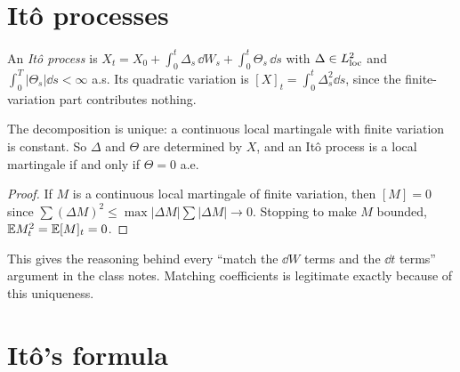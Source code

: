 \section{It\^o processes}

\begin{definition}
An \emph{It\^o process} is $X_t=X_0+\int_0^t\Delta_s\,\dd W_s+\int_0^t\Theta_s\,\dd s$ with $\Delta\in L^2_{\rm loc}$ and $\int_0^T|\Theta_s|\dd s<\infty$ a.s. Its quadratic variation is $[X]_t=\int_0^t\Delta_s^2\dd s$, since the finite-variation part contributes nothing.
\end{definition}

\begin{theorem}\label{thm:decomp}
The decomposition is unique: a continuous local martingale with finite variation is constant. So $\Delta$ and $\Theta$ are determined by $X$, and an It\^o process is a local martingale if and only if $\Theta=0$ a.e.
\end{theorem}
\begin{proof}
If $M$ is a continuous local martingale of finite variation, then $[M]=0$ since $\sum(\Delta M)^2\le\max|\Delta M|\sum|\Delta M|\to0$. Stopping to make $M$ bounded, $\mathbb{E} M_t^2=\mathbb{E}[M]_t=0$.
\end{proof}

This gives the reasoning behind every ``match the $\dd W$ terms and the $\dd t$ terms'' argument in the class notes. Matching coefficients is legitimate exactly because of this uniqueness.

\section{It\^o's formula}

